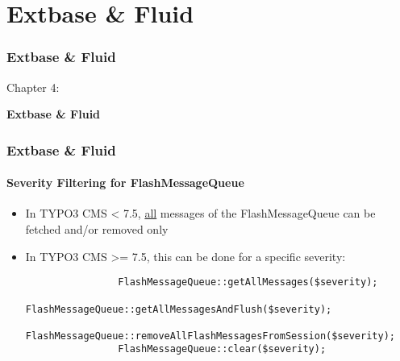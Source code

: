 %

\section{Extbase \& Fluid}
\begin{frame}[fragile]
	\frametitle{Extbase \& Fluid}

	\begin{center}\huge{Chapter 4:}\end{center}
	\begin{center}\huge{\color{typo3darkgrey}\textbf{Extbase \& Fluid}}\end{center}

\end{frame}


\begin{frame}[fragile]
	\frametitle{Extbase \& Fluid}
	\framesubtitle{Severity Filtering for FlashMessageQueue}

	\begin{itemize}

		\item In TYPO3 CMS < 7.5, \underline{all} messages of the FlashMessageQueue can be
			fetched and/or removed only

		\item In TYPO3 CMS >= 7.5, this can be done for a specific severity:

			\begin{lstlisting}
				FlashMessageQueue::getAllMessages($severity);
				FlashMessageQueue::getAllMessagesAndFlush($severity);
				FlashMessageQueue::removeAllFlashMessagesFromSession($severity);
				FlashMessageQueue::clear($severity);
			\end{lstlisting}

	\end{itemize}

\end{frame}

